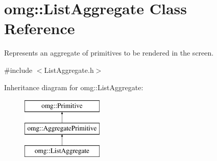 \hypertarget{classomg_1_1_list_aggregate}{}\section{omg\+::List\+Aggregate Class Reference}
\label{classomg_1_1_list_aggregate}


Represents an aggregate of primitives to be rendered in the screen.  




{\ttfamily \#include $<$List\+Aggregate.\+h$>$}

Inheritance diagram for omg\+::List\+Aggregate\+:\begin{figure}[H]
\begin{center}
\leavevmode
\includegraphics[height=3.000000cm]{classomg_1_1_list_aggregate}
\end{center}
\end{figure}
